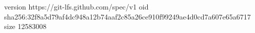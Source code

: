 version https://git-lfs.github.com/spec/v1
oid sha256:32f8a5d79af4dc948a12b74aaf2c85a26ce910f99249ae4d0cd7a607e65a6717
size 12583008
